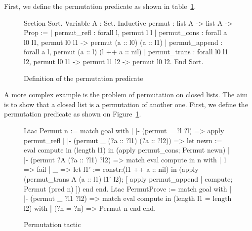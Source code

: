 First, we define the permutation predicate as shown in table~\ref{permutpred}.

\begin{figure}
\begin{centerframe}
\begin{coq_example*}
Section Sort.
Variable A : Set.
Inductive permut : list A -> list A -> Prop :=
  | permut_refl   : forall l, permut l l
  | permut_cons   :
      forall a l0 l1, permut l0 l1 -> permut (a :: l0) (a :: l1)
  | permut_append : forall a l, permut (a :: l) (l ++ a :: nil)
  | permut_trans  :
      forall l0 l1 l2, permut l0 l1 -> permut l1 l2 -> permut l0 l2.
End Sort.
\end{coq_example*}
\end{centerframe}
\caption{Definition of the permutation predicate}
\label{permutpred}
\end{figure}

A more complex example is the problem of permutation on closed lists.
The aim is to show that a closed list is a permutation of another one.
First, we define the permutation predicate as shown on
Figure~\ref{permutpred}.

\begin{figure}
\begin{centerframe}
\begin{coq_example}
Ltac Permut n :=
  match goal with
  | |- (permut _ ?l ?l) => apply permut_refl
  | |- (permut _ (?a :: ?l1) (?a :: ?l2)) =>
      let newn := eval compute in (length l1) in
      (apply permut_cons; Permut newn)
  | |- (permut ?A (?a :: ?l1) ?l2) =>
      match eval compute in n with
      | 1 => fail
      | _ =>
          let l1' := constr:(l1 ++ a :: nil) in
          (apply (permut_trans A (a :: l1) l1' l2);
            [ apply permut_append | compute; Permut (pred n) ])
      end
  end.
Ltac PermutProve :=
  match goal with
  | |- (permut _ ?l1 ?l2) =>
      match eval compute in (length l1 = length l2) with
      | (?n = ?n) => Permut n
      end
  end.
\end{coq_example}
\end{centerframe}
\caption{Permutation tactic}
\label{permutltac}
\end{figure}

